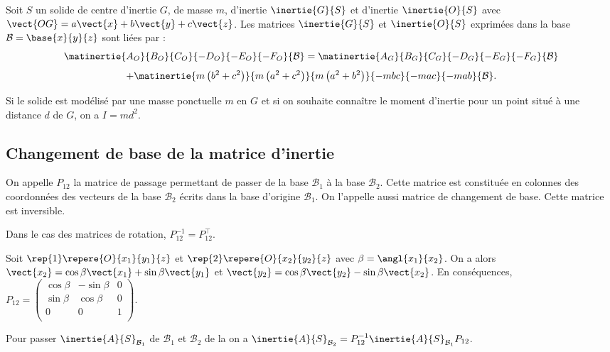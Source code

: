 \begin{theoreme}
Soit $S$ un solide de centre d'inertie $G$, de masse $m$, d'inertie $\inertie{G}{S}$ et d'inertie $\inertie{O}{S}$ avec $\vect{OG}=a\vect{x}+b\vect{y}+c\vect{z}$. Les matrices $\inertie{G}{S}$ et $\inertie{O}{S}$ exprimées dans la base $\mathcal{B}=\base{x}{y}{z}$ sont liées par : 
$$
\matinertie{A_O}{B_O}{C_O}{-D_O}{-E_O}{-F_O}{\mathcal{B}}
= \matinertie{A_G}{B_G}{C_G}{-D_G}{-E_G}{-F_G}{\mathcal{B}}$$
$$
+ \matinertie{m\left(b^2+c^2\right)}{m\left(a^2+c^2\right)}{m\left(a^2+b^2\right)}{-mbc}{-mac}{-mab}{\mathcal{B}}.
$$


Si le solide est modélisé par une masse ponctuelle $m$ en $G$ et si on souhaite connaître le moment d'inertie pour un point situé à une distance $d$ de $G$, on a $I=md^2$.

\end{theoreme}


\subsection{Changement de base de la matrice d'inertie}
\begin{defi}
On appelle $P_{12}$ la matrice de passage permettant de passer de la base $\mathcal{B}_1$ à la base $\mathcal{B}_2$. Cette matrice est constituée en colonnes des coordonnées des vecteurs de la base $\mathcal{B}_2$ écrits dans la base d'origine $\mathcal{B}_1$. On l'appelle aussi matrice de changement de base. Cette matrice est inversible.

Dans le cas des matrices de rotation, $P_{12}^{-1}=P_{12}^{\top}$.
\end{defi}

\begin{exemple}
Soit $\rep{1}\repere{O}{x_1}{y_1}{z}$ et $\rep{2}\repere{O}{x_2}{y_2}{z}$ avec
$\beta = \angl{x_1}{x_2}$. On a alors $\vect{x_2}=\cos\beta\vect{x_1}+\sin\beta\vect{y_1}$ et $\vect{y_2}=\cos\beta\vect{y_2}-\sin\beta\vect{x_2}$. En conséquences, $P_{12}=
\begin{pmatrix} 
\cos\beta & -\sin \beta & 0\\  
\sin\beta & \cos \beta & 0\\  
0 & 0 & 1\\  
\end{pmatrix}$.
\end{exemple}

\begin{resultat}
Pour passer $\inertie{A}{S}_{\mathcal{B}_1}$ de ${\mathcal{B}_1}$ et ${\mathcal{B}_2}$  de la on a $\inertie{A}{S}_{\mathcal{B}_2} = P_{12}^{-1} \inertie{A}{S}_{\mathcal{B}_1} P_{12} $.
\end{resultat}



